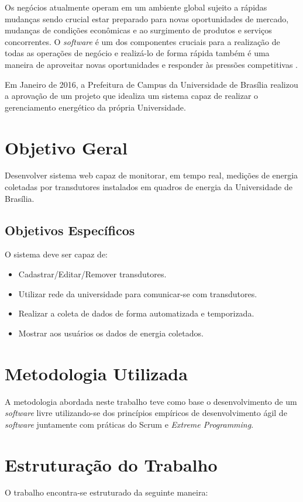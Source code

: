 Os negócios atualmente operam em um ambiente global sujeito a rápidas mudanças sendo crucial
estar preparado para novas oportunidades de mercado, mudanças de condições econômicas e ao surgimento
de produtos e serviços concorrentes. O \textit{software} é um dos componentes cruciais para a realização
de todas as operações de negócio e realizá-lo de forma rápida também é uma maneira de aproveitar novas
oportunidades e responder às pressões competitivas \cite{sommerville_2006}.

Em Janeiro de 2016, a Prefeitura de Campus da Universidade de Brasília realizou a aprovação de um projeto que
idealiza um sistema capaz de realizar o gerenciamento energético da própria Universidade.

\section{Objetivo Geral}
Desenvolver sistema web capaz de monitorar, em tempo real, medições de energia coletadas por transdutores
instalados em quadros de energia da Universidade de Brasília.

\subsection{Objetivos Específicos}
O sistema deve ser capaz de:
\begin{itemize}
    \item Cadastrar/Editar/Remover transdutores.
    \item Utilizar rede da universidade para comunicar-se com transdutores.
    \item Realizar a coleta de dados de forma automatizada e temporizada.
    \item Mostrar aos usuários os dados de energia coletados.
\end{itemize}

\section{Metodologia Utilizada}
A metodologia abordada neste trabalho teve como base o desenvolvimento de um \textit{software} livre
utilizando-se dos princípios empíricos de desenvolvimento ágil de \textit{software} juntamente com práticas do Scrum e \textit{Extreme Programming}.

\section{Estruturação do Trabalho}
O trabalho encontra-se estruturado da seguinte maneira:

